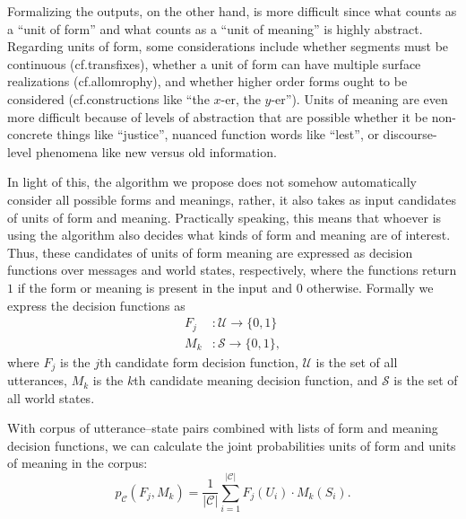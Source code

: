 Formalizing the outputs, on the other hand, is more difficult since what counts as a ``unit of form'' and what counts as a ``unit of meaning'' is highly abstract.
Regarding units of form, some considerations include whether segments must be continuous (cf.\@ transfixes), whether a unit of form can have multiple surface realizations (cf.\@ allomrophy), and whether higher order forms ought to be considered (cf.\@ constructions like ``the $x$-er, the $y$-er'').
Units of meaning are even more difficult because of levels of abstraction that are possible whether it be non-concrete things like ``justice'', nuanced function words like ``lest'', or discourse-level phenomena like new versus old information.

In light of this, the algorithm we propose does not somehow automatically consider all possible forms and meanings, rather, it also takes as input candidates of units of form and meaning.
Practically speaking, this means that whoever is using the algorithm also decides what kinds of form and meaning are of interest.
Thus, these candidates of units of form meaning are expressed as decision functions over messages and world states, respectively,
  where the functions return $1$ if the form or meaning is present in the input and $0$ otherwise.
Formally we express the decision functions as
\begin{align}
  F_j &: \mathcal U \rightarrow \{0,1\} \\
  M_k &: \mathcal S \rightarrow \{0,1\}
  ,
\end{align}
where
  $F_j$ is the $j$th candidate form decision function,
  $\mathcal U$ is the set of all utterances,
  $M_k$ is the $k$th candidate meaning decision function,
  and $\mathcal S$ is the set of all world states.

With corpus of utterance--state pairs combined with lists of form and meaning decision functions, we can calculate the joint probabilities units of form and units of meaning in the corpus:
\begin{equation}
  p_{\mathcal C}(F_j, M_k) = \frac1{|\mathcal C|} \sum^{|\mathcal C|}_{i=1} F_j(U_i) \cdot M_k(S_i)
  .
  \label{eq:morph-joint}
\end{equation}



